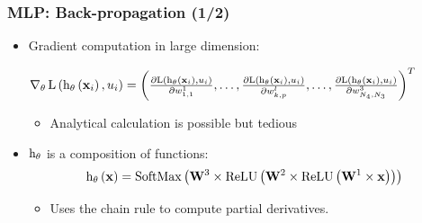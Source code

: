 \begin{frame}
  \frametitle{\acl{MLP}: Back-propagation (1/2)}
  \begin{itemize}
    \item Gradient computation in large dimension:

    $
    \operatorname{\nabla}_{\mathbf{\theta}} \mathrm{L} \left ( {\mathrm{h}_{\mathbf{\theta}} \left ( {\mathbf{x}_i} \right ), u_i} \right ) =
    \left( \frac{\partial \mathrm{L} \left ( {\mathrm{h}_{\mathbf{\theta}} \left ( {\mathbf{x}_i} \right ), u_i} \right ) }{\partial w_{1,1}^1},\ldots,\frac{\partial \mathrm{L} \left ( {\mathrm{h}_{\mathbf{\theta}} \left ( {\mathbf{x}_i} \right ), u_i} \right ) }{\partial w_{k,p}^l},\ldots,\frac{\partial \mathrm{L} \left ( {\mathrm{h}_{\mathbf{\theta}} \left ( {\mathbf{x}_i} \right ), u_i} \right ) }{\partial w_{N_{4},N_{3}}^{3}} \right)^T
    $

    \begin{itemize}
    \item Analytical calculation is possible but tedious
    \end{itemize}
  \item $\mathrm{h}_{\mathbf{\theta}}$ is a
      composition of functions:
      \[
        \apply{\decisionFunc_{\params}}{\example} = \apply{\softMaxFunc}{%
          \weightMatrix^3 \times
          \apply{\ReLUFunc}{%
            \weightMatrix^2 \times
            \apply{\ReLUFunc}{%
              \weightMatrix^1 \times \example
            }
          }
        }
      \]
      \begin{itemize}
      \item Uses the chain rule to compute partial derivatives.
      \end{itemize}
  \end{itemize}

\end{frame}

